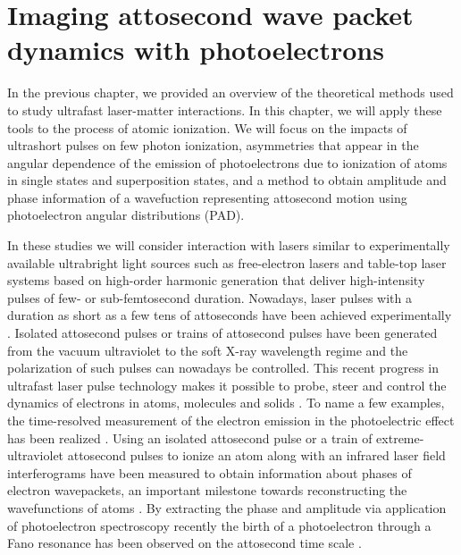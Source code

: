 \chapter{Imaging attosecond wave packet dynamics with photoelectrons} %
\label{cha:imaging_wave_packets_with_photoelectrons}

In the previous chapter, we provided an overview of the theoretical methods used to study ultrafast laser-matter interactions. In this chapter, we will apply these tools to the process of atomic ionization. We will focus on the impacts of ultrashort pulses on few photon ionization, asymmetries that appear in the angular dependence of the emission of photoelectrons due to ionization of atoms in single states and superposition states, and a method to obtain amplitude and phase information of a wavefuction representing attosecond motion using photoelectron angular distributions (PAD). 

In these studies we will consider interaction with lasers similar to experimentally available ultrabright light sources such as free-electron lasers \cite{seddon2017} and table-top laser systems based on high-order harmonic generation \cite{popmintchev2010,chini2014} that deliver high-intensity pulses of few- or sub-femtosecond duration. Nowadays, laser pulses with a duration as short as a few tens of attoseconds have been achieved experimentally \cite{zhao2012,chen2014}. Isolated attosecond pulses or trains of attosecond pulses have been generated from the vacuum ultraviolet to the soft X-ray wavelength regime and the polarization of such pulses can nowadays be controlled. This recent progress in ultrafast laser pulse technology makes it possible to probe, steer and control the dynamics of electrons in atoms, molecules and solids \cite{vrakking2014,pazourek2015,calegari2016,xu2016,ramasesha2016,peng2019}.
To name a few examples, the time-resolved measurement of the electron emission in the photoelectric effect has been realized \cite{cavalieri2007,schultze2010,klunder2011, tao2016,isinger2017}. Using an isolated attosecond pulse or a train of extreme-ultraviolet attosecond pulses to ionize an atom along with an infrared laser field interferograms have been measured to obtain information about phases of electron wavepackets, an important milestone towards reconstructing the wavefunctions of atoms \cite{remetter2006,mauritsson2010}. By extracting the phase and amplitude via application of photoelectron spectroscopy recently the birth of a photoelectron through a Fano resonance has been observed on the attosecond time scale \cite{gruson2016}.

